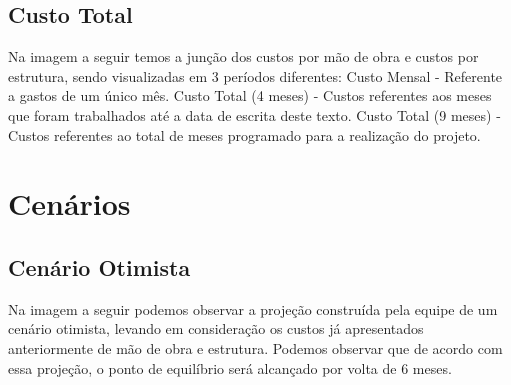 \documentclass[
	12pt,				%
	openany,			%
	twoside,			%
	a4paper,			%
	english,			%
	french,				%
	spanish,			%
	brazil				%
	]{abntex2}
\begin{document}
\subsection{Custo Total}

Na imagem a seguir temos a junção dos custos por mão de obra e custos por estrutura, sendo visualizadas em 3 períodos diferentes:
Custo Mensal - Referente a gastos de um único mês.
Custo Total (4 meses) - Custos referentes aos meses que foram trabalhados até a data de escrita deste texto.
Custo Total (9 meses) - Custos referentes ao total de meses programado para a realização do projeto.

\begin{table}[h!]
	\centering
	\caption{Custo Total por Categoria}
	\label{tab:custo-total}
\end{table}

\section{Cenários}

\subsection{Cenário Otimista}

Na imagem a seguir podemos observar a projeção construída pela equipe de um cenário otimista, levando em consideração os custos já apresentados anteriormente de mão de obra e estrutura. Podemos observar que de acordo com essa projeção, o ponto de equilíbrio será alcançado por volta de 6 meses.
\end{document}
